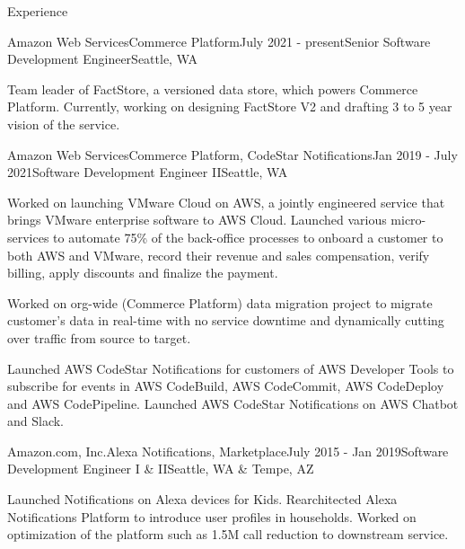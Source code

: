 \documentclass{resume} %
\begin{document}

\begin{rSection}{Experience}

    \begin{rSubsection}{Amazon Web Services}{Commerce Platform}{July 2021 - present}{Senior Software Development Engineer}{Seattle, WA}
    	\item Team leader of FactStore, a versioned data store, which powers Commerce Platform. Currently, working on designing FactStore V2 and drafting 3 to 5 year vision of the service.
    \end{rSubsection}
    
    \begin{rSubsection}{Amazon Web Services}{Commerce Platform, CodeStar Notifications}{Jan 2019 - July 2021}{Software Development Engineer II}{Seattle, WA}
    	\item Worked on launching VMware Cloud on AWS, a jointly engineered service that brings VMware enterprise software to AWS Cloud. Launched various micro-services to automate 75\% of the back-office processes to onboard a customer to both AWS and VMware, record their revenue and sales compensation, verify billing, apply discounts and finalize the payment.
    	\item Worked on org-wide (Commerce Platform) data migration project to migrate customer's data in real-time with no service downtime and dynamically cutting over traffic from source to target.
    	\item Launched AWS CodeStar Notifications for customers of AWS Developer Tools to subscribe for events in AWS CodeBuild, AWS CodeCommit, AWS CodeDeploy and AWS CodePipeline. Launched AWS CodeStar Notifications on AWS Chatbot and Slack.
	\end{rSubsection}

	\begin{rSubsection}{Amazon.com, Inc.}{Alexa Notifications, Marketplace}{July 2015 - Jan 2019}{Software Development Engineer I \& II}{Seattle, WA \& Tempe, AZ }
		\item Launched Notifications on Alexa devices for Kids. Rearchitected Alexa Notifications Platform to introduce user profiles in households. Worked on optimization of the platform such as 1.5M call reduction to downstream service.
		

\end{rSubsection}
\end{rSection}
\end{document}
